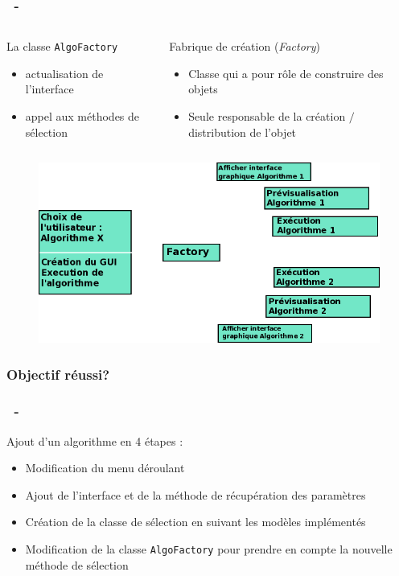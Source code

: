 \documentclass[11pt]{beamer}
\begin{document}
\begin{frame}
\frametitle{\subsecname ~- \subsubsecname}
\begin{columns}
	\begin{column}{5cm}
\begin{block}{La classe \texttt{AlgoFactory}}
	\begin{itemize}
	\item actualisation de l'interface
	\item appel aux méthodes de sélection
	\end{itemize}
\end{block}	
\end{column}
	\begin{column}{6.5cm}
\begin{block}{Fabrique de création (\emph{Factory})}
	\begin{itemize}
		\item Classe qui a pour rôle de construire des objets
		\item Seule responsable de la création $/$ distribution de l’objet
	\end{itemize}
\end{block}
\end{column}
	\end{columns}
	
	\begin{figure}
		\includegraphics[scale=0.33]{testFabrique.png}
	\end{figure}
\end{frame}
\subsubsection*{Objectif réussi?}
\begin{frame}
\frametitle{\subsecname ~- \subsubsecname}
\begin{block}{Ajout d'un algorithme en 4 étapes :}
	\begin{itemize}
		\item Modification du menu déroulant
		\item Ajout de l'interface et de la méthode de récupération des paramètres 
		\item Création de la classe de sélection en suivant les modèles implémentés
		\item Modification de la classe \texttt{AlgoFactory} pour prendre en compte la nouvelle méthode de sélection
	\end{itemize}
	\end{block}
\end{frame}
\end{document}
